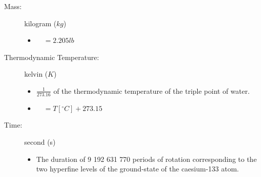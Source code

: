 \documentclass[]{report}
\newcommand{\items}{\item\ \ }
\newcommand{\degrees}{^{\circ}}
\begin{document}
\begin{description}
\item[Mass:] kilogram ($kg$)
\begin{itemize}
\items $= 2.205 lb$
\end{itemize}				

\item[Thermodynamic Temperature:] kelvin ($K$)
\begin{itemize}
\item $\frac{1}{273.16}$ of the thermodynamic temperature of the triple point of water.
\items $= T [\degrees C] + 273.15$
\end{itemize}

\item[Time:] second (s)
\begin{itemize}
\item The duration of 9 192 631 770 periods of rotation corresponding to the two hyperfine levels of the ground-state of the caesium-133 atom.
\end{itemize}				
\end{description}	
\end{document}
